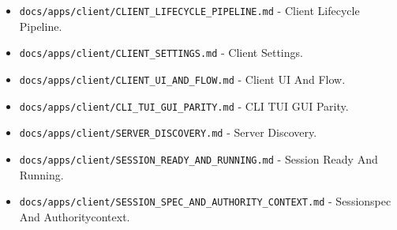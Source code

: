 \documentclass[9pt,a4paper,openany]{book}
\begin{document}
\begin{itemize}
\item \texttt{docs/\allowbreak{}apps/\allowbreak{}client/\allowbreak{}CLIENT\_\allowbreak{}LIFECYCLE\_\allowbreak{}PIPELINE.\allowbreak{}md} -\allowbreak{} Client Lifecycle Pipeline.\allowbreak{}
\end{itemize}

\begin{itemize}
\item \texttt{docs/\allowbreak{}apps/\allowbreak{}client/\allowbreak{}CLIENT\_\allowbreak{}SETTINGS.\allowbreak{}md} -\allowbreak{} Client Settings.\allowbreak{}
\end{itemize}

\begin{itemize}
\item \texttt{docs/\allowbreak{}apps/\allowbreak{}client/\allowbreak{}CLIENT\_\allowbreak{}UI\_\allowbreak{}AND\_\allowbreak{}FLOW.\allowbreak{}md} -\allowbreak{} Client UI And Flow.\allowbreak{}
\end{itemize}

\begin{itemize}
\item \texttt{docs/\allowbreak{}apps/\allowbreak{}client/\allowbreak{}CLI\_\allowbreak{}TUI\_\allowbreak{}GUI\_\allowbreak{}PARITY.\allowbreak{}md} -\allowbreak{} CLI TUI GUI Parity.\allowbreak{}
\end{itemize}

\begin{itemize}
\item \texttt{docs/\allowbreak{}apps/\allowbreak{}client/\allowbreak{}SERVER\_\allowbreak{}DISCOVERY.\allowbreak{}md} -\allowbreak{} Server Discovery.\allowbreak{}
\end{itemize}

\begin{itemize}
\item \texttt{docs/\allowbreak{}apps/\allowbreak{}client/\allowbreak{}SESSION\_\allowbreak{}READY\_\allowbreak{}AND\_\allowbreak{}RUNNING.\allowbreak{}md} -\allowbreak{} Session Ready And Running.\allowbreak{}
\end{itemize}

\begin{itemize}
\item \texttt{docs/\allowbreak{}apps/\allowbreak{}client/\allowbreak{}SESSION\_\allowbreak{}SPEC\_\allowbreak{}AND\_\allowbreak{}AUTHORITY\_\allowbreak{}CONTEXT.\allowbreak{}md} -\allowbreak{} Sessionspec And Authoritycontext.\allowbreak{}
\end{itemize}
\end{document}
